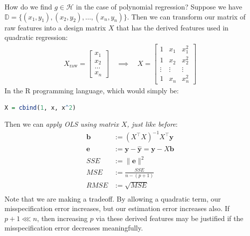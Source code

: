 \documentclass[12pt, a4paper]{article}
\theoremstyle{definition}
\begin{document}
	How do we find $g\in \mathcal{H}$ in the case of polynomial regression? Suppose
	we have $\mathbb{D}=\{(x_1,y_1),(x_2,y_2),\ldots,(x_n,y_n)\}$. Then we can
	transform our matrix of raw features into a design matrix $X$ that has the
	derived features used in quadratic regression:
	\begin{align*}
		X_{\text{raw}} = \begin{bmatrix}
			x_1\\
			x_2\\
			\ldots\\
			x_n
		\end{bmatrix}
		\quad
		\implies
		\quad
		X = \begin{bmatrix}
			1 & x_1 & x_1^2\\
			1 & x_2 & x_2^2\\
			\vdots & \vdots & \vdots\\
			1 & x_n & x_n^2
		\end{bmatrix}
	\end{align*}
	In the R programming language, which would simply be:
	\begin{lstlisting}[language=R]
X = cbind(1, x, x^2)
	\end{lstlisting}
	Then we can \textit{apply OLS using matrix $X$, just like before}:
	\begin{align*}
		\bm{b} &:= (X^\top X)^{-1}X^\top \bm{y}\\
		\bm{e} &:= \bm{y} - \bm{\hat{y}} = \bm{y} - X\bm{b}\\
		SSE &:= \|\bm{e}\|^2\\
		MSE &:= \frac{SSE}{n - (p + 1)}\\
		RMSE &:= \sqrt{MSE}\\
	\end{align*}
	Note that we are making a tradeoff. By allowing a quadratic term, our
	misspecification error increases, but our estimation error increases also.
	If $p+1\lll n$, then increasing $p$ via these derived features may
	be justified if the misspecification error decreases meaningfully.
\end{document}
